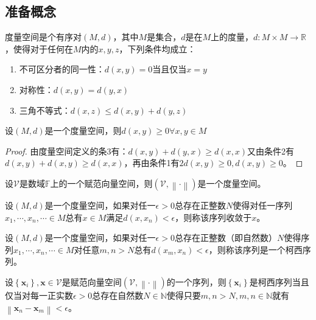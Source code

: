 \documentclass[main.tex]{subfiles}
\begin{document}
\subsection{准备概念}
\begin{definition}[度量空间]
度量空间是个有序对$\left(M,d\right)$，其中$M$是集合，$d$是在$M$上的度量，$d:M\times M\rightarrow\mathbb{R}$，使得对于任何在$M$内的$x,y,z$，下列条件均成立：
\begin{enumerate}
    \item 不可区分者的同一性：$d\left(x,y\right)=0$当且仅当$x=y$
    \item 对称性：$d\left(x,y\right)=d\left(y,x\right)$
    \item 三角不等式：$d\left(x,z\right)\leq d\left(x,y\right)+d\left(y,z\right)$
\end{enumerate}
\end{definition}
\begin{theorem}
设$\left(M,d\right)$是一个度量空间，则$d\left(x,y\right)\geq 0\forall x,y\in M$
\end{theorem}
\begin{proof}
由度量空间定义的条3有：$d\left(x,y\right)+d\left(y,x\right)\geq d\left(x,x\right)$又由条件2有$d\left(x,y\right)+d\left(x,y\right)\geq d\left(x,x\right)$，再由条件1有$2d\left(x,y\right)\geq 0,d\left(x,y\right)\geq 0$。
\end{proof}

\begin{example}
设$\mathcal{V}$是数域$\mathbb{F}$上的一个赋范向量空间，则$\left(\mathcal{V},\left\|\cdot\right\|\right)$是一个度量空间。
\end{example}

\begin{definition}[序列的收敛性]
设$\left(M,d\right)$是一个度量空间，如果对任一$\epsilon>0$总存在正整数$N$使得对任一序列$x_1,\cdots,x_n,\cdots\in M$总有$x\in M$满足$d\left(x,x_n\right)<\epsilon$，则称该序列收敛于$x$。
\end{definition}

\begin{definition}[柯西序列]
设$\left(M,d\right)$是一个度量空间，如果对任一$\epsilon>0$总存在正整数（即自然数）$N$使得序列$x_1,\cdots,x_n,\cdots\in M$对任意$m,n>N$总有$d\left(x_m,x_n\right)<\epsilon$，则称该序列是一个柯西序列。
\end{definition}

\begin{example}
设$\left\{\mathbf{x}_i\right\},\mathbf{x}\in\mathcal{V}$是赋范向量空间$\left(\mathcal{V},\left\|\cdot\right\|\right)$的一个序列，则$\left\{\mathbf{x}_i\right\}$是柯西序列当且仅当对每一正实数$\epsilon>0$总存在自然数$N\in\mathbb{N}$使得只要$m,n>N, m,n\in\mathbb{N}$就有$\left\|\mathbf{x}_n-\mathbf{x}_m\right\|<\epsilon$。
\end{example}
\end{document}
